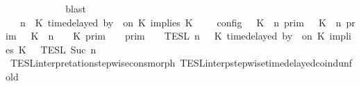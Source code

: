 \begin{isabellebody}
\ \ \ \ \ \ \ \ \isamarkupfalse%
\ {}\ \isamarkupfalse%
\ blast\isanewline
\ \ \ \ \ \ \isamarkupfalse%
\ \isamarkupfalse%
\ {\isacartoucheopen}{\isasymlbrakk}\ {\isasymGamma}{\isacharcomma}\ n\ {\isasymturnstile}\ {\isacharparenleft}K\ time{\isacharminus}delayed\ by\ {\isasymdelta}{\isasymtau}\ on\ K\ implies\ K\ {\isacharhash}\ {\isasymPsi}\ {\isasymtriangleright}\ {\isasymPhi}\ {\isasymrbrakk}\isactrlsub c\isactrlsub o\isactrlsub n\isactrlsub f\isactrlsub i\isactrlsub g\ {\isacharequal}\ {\isacharparenleft}{\isasymlbrakk}\ K\ {\isasymnot}{\isasymUp}\ n\ {\isasymrbrakk}\isactrlsub p\isactrlsub r\isactrlsub i\isactrlsub m\ {\isasymunion}\ {\isasymlbrakk}\ K\ {\isasymUp}\ n\ {\isasymrbrakk}\isactrlsub p\isactrlsub r\isactrlsub i\isactrlsub m\ {\isasyminter}\ {\isasymlbrakk}\ K\ {\isacharat}\ n\ {\isasymoplus}\ {\isasymdelta}{\isasymtau}\ {\isasymRightarrow}\ K\ {\isasymrbrakk}\isactrlsub p\isactrlsub r\isactrlsub i\isactrlsub m{\isacharparenright}\ {\isasyminter}\ {\isacharparenleft}{\isasymlbrakk}{\isasymlbrakk}\ {\isasymGamma}\ {\isasymrbrakk}{\isasymrbrakk}\isactrlsub p\isactrlsub r\isactrlsub i\isactrlsub m\ {\isasyminter}\ {\isacharparenleft}{\isasymlbrakk}{\isasymlbrakk}\ {\isasymPsi}\ {\isasymrbrakk}{\isasymrbrakk}\isactrlsub T\isactrlsub E\isactrlsub S\isactrlsub L\isactrlbsup {\isasymge}\ n\isactrlesup \ {\isasyminter}\ {\isasymlbrakk}{\isasymlbrakk}\ {\isacharparenleft}K\ time{\isacharminus}delayed\ by\ {\isasymdelta}{\isasymtau}\ on\ K\ implies\ K\ {\isacharhash}\ {\isasymPhi}\ {\isasymrbrakk}{\isasymrbrakk}\isactrlsub T\isactrlsub E\isactrlsub S\isactrlsub L\isactrlbsup {\isasymge}\ Suc\ n\isactrlesup {\isacharparenright}{\isacharparenright}{\isacartoucheclose}\isanewline
\ \ \ \ \ \ \ \ \isamarkupfalse%
\ TESL{\isacharunderscore}interpretation{\isacharunderscore}stepwise{\isacharunderscore}cons{\isacharunderscore}morph\ TESL{\isacharunderscore}interp{\isacharunderscore}stepwise{\isacharunderscore}timedelayed{\isacharunderscore}coind{\isacharunderscore}unfold\isanewline
\ \ \ \ \ \ \isamarkupfalse%
\ {\isacharminus}\isanewline
\ \ \ \ \ \ \ \ \isamarkupfalse%

\end{isabellebody}
